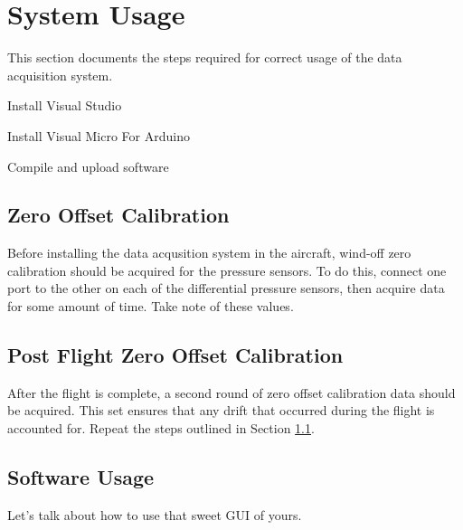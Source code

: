 \chapter{System Usage}
This section documents the steps required for correct usage of the data acquisition system.

\item Install Visual Studio	
\item Install Visual Micro For Arduino
\item Compile and upload software
\section{Zero Offset Calibration}
\label{preflightZeroCalib}
Before installing the data acqusition system in the aircraft, wind-off zero calibration should be acquired for the pressure sensors. To do this, connect one port to the other on each of the differential pressure sensors, then acquire data for some amount of time. Take note of these values.


\section{Post Flight Zero Offset Calibration}
After the flight is complete, a second round of zero offset calibration data should be acquired. This set ensures that any drift that occurred during the flight is accounted for. Repeat the steps outlined in Section \ref{preflightZeroCalib}.


\section{Software Usage}
Let's talk about how to use that sweet GUI of yours.

